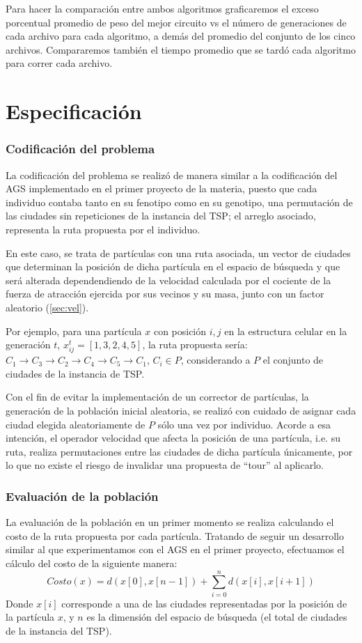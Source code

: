 \documentclass[12pt]{article}
\begin{document}
Para hacer la comparación entre ambos algoritmos graficaremos el exceso porcentual promedio de peso del mejor circuito vs el número de generaciones de cada archivo para cada algoritmo, a demás del promedio del conjunto de los cinco archivos. Compararemos también el tiempo promedio que se tardó cada algoritmo para correr cada archivo.

\newpage

\section{Especificación}\label{sec:esp}
\subsubsection*{Codificación del problema}
La codificación del problema se realizó de manera similar a la codificación del AGS implementado en el primer proyecto de la materia, puesto que
cada individuo contaba tanto en su fenotipo como en su genotipo, una permutación de las ciudades sin repeticiones de la instancia del TSP; el arreglo asociado, representa la ruta propuesta por el individuo.

En este caso, se trata de partículas con una ruta asociada, un vector de ciudades que determinan la posición de dicha partícula en el espacio de
búsqueda y que será alterada dependendiendo de la velocidad calculada por el cociente de la fuerza de atracción ejercida por sus vecinos y su masa,
junto con un factor aleatorio (\ref{sec:vel}).

Por ejemplo, para una partícula $x$ con posición $i,j$ en la estructura celular en la generación $t$,
$x_{ij}^t = [1,3,2,4,5]$, la ruta propuesta sería: $C_1 \to C_3 \to C_2 \to C_4 \to C_5 \to C_1$, $C_i \in P$, considerando a $P$ el conjunto de ciudades de la instancia de TSP.

Con el fin de evitar la implementación de un corrector de partículas, la generación de la población inicial aleatoria, se realizó con cuidado de asignar cada ciudad elegida aleatoriamente de $P$ sólo una vez por individuo. Acorde a esa intención, el operador velocidad que afecta la posición de una partícula, i.e. su ruta, realiza permutaciones entre las ciudades de dicha partícula únicamente, por lo que no existe el riesgo de invalidar una propuesta de ``tour'' al aplicarlo.

\subsubsection*{Evaluación de la población}
La evaluación de la población en un primer momento se realiza calculando el costo de la ruta propuesta por cada partícula. Tratando de seguir un
desarrollo similar al que experimentamos con el AGS en el primer proyecto, efectuamos el cálculo del costo de la siguiente manera:
\begin{equation}
  Costo(x) = d(x[0],x[n-1]) + \sum\limits_{i=0}^{n} d(x[i],x[i+1])
\end{equation}
Donde $x[i]$ corresponde a una de las ciudades representadas por la posición de la partícula $x$, y $n$ es la dimensión del espacio de búsqueda (el total de ciudades de la instancia del TSP).
\end{document}
